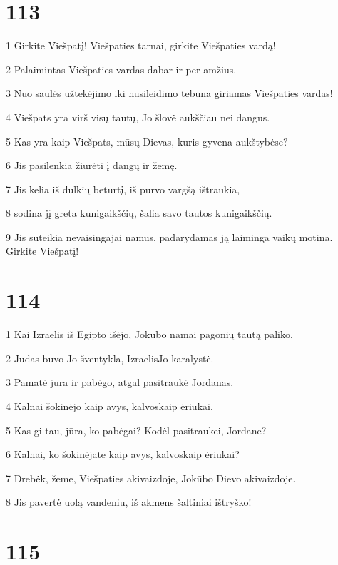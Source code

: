 \chapter{113}


\par 1 Girkite Viešpatį! Viešpaties tarnai, girkite Viešpaties vardą! 
\par 2 Palaimintas Viešpaties vardas dabar ir per amžius. 
\par 3 Nuo saulės užtekėjimo iki nusileidimo tebūna giriamas Viešpaties vardas! 
\par 4 Viešpats yra virš visų tautų, Jo šlovė aukščiau nei dangus. 
\par 5 Kas yra kaip Viešpats, mūsų Dievas, kuris gyvena aukštybėse? 
\par 6 Jis pasilenkia žiūrėti į dangų ir žemę. 
\par 7 Jis kelia iš dulkių beturtį, iš purvo vargšą ištraukia, 
\par 8 sodina jį greta kunigaikščių, šalia savo tautos kunigaikščių. 
\par 9 Jis suteikia nevaisingajai namus, padarydamas ją laiminga vaikų motina. Girkite Viešpatį!


\chapter{114}


\par 1 Kai Izraelis iš Egipto išėjo, Jokūbo namai pagonių tautą paliko, 
\par 2 Judas buvo Jo šventykla, Izraelis­Jo karalystė. 
\par 3 Pamatė jūra ir pabėgo, atgal pasitraukė Jordanas. 
\par 4 Kalnai šokinėjo kaip avys, kalvos­kaip ėriukai. 
\par 5 Kas gi tau, jūra, ko pabėgai? Kodėl pasitraukei, Jordane? 
\par 6 Kalnai, ko šokinėjate kaip avys, kalvos­kaip ėriukai? 
\par 7 Drebėk, žeme, Viešpaties akivaizdoje, Jokūbo Dievo akivaizdoje. 
\par 8 Jis pavertė uolą vandeniu, iš akmens šaltiniai ištryško!


\chapter{115}


